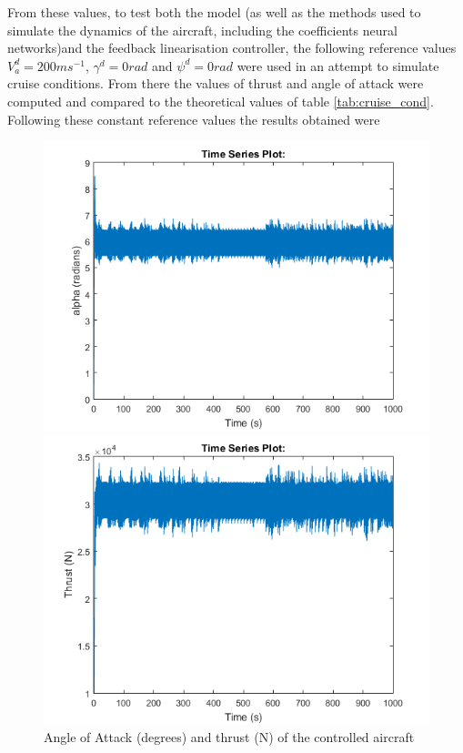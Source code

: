 From these values, to test both the model (as well as the methods used to simulate the dynamics of the aircraft, including the coefficients neural networks)and the feedback linearisation controller, the following reference values $V_a^d=200 ms^{-1}$, $\gamma^d = 0 rad$ and $\psi^d=0 rad$ were used in an attempt to simulate cruise conditions. From there the values of thrust and angle of attack were computed and  compared to the theoretical values of table \ref{tab:cruise_cond}. 
Following these constant reference values the results obtained were

\begin{figure}
\centering
\begin{minipage}{0.49\textwidth}
\includegraphics[width=\textwidth]{Figures/Results/aoa_check.PNG}
\end{minipage}
\begin{minipage}{0.49\textwidth}
\includegraphics[width=\textwidth]{Figures/Results/thrust_check.PNG}
\end{minipage}
\caption[AoA and thrust validation]{Angle of Attack (degrees) and thrust (N) of the controlled aircraft}
\end{figure}

